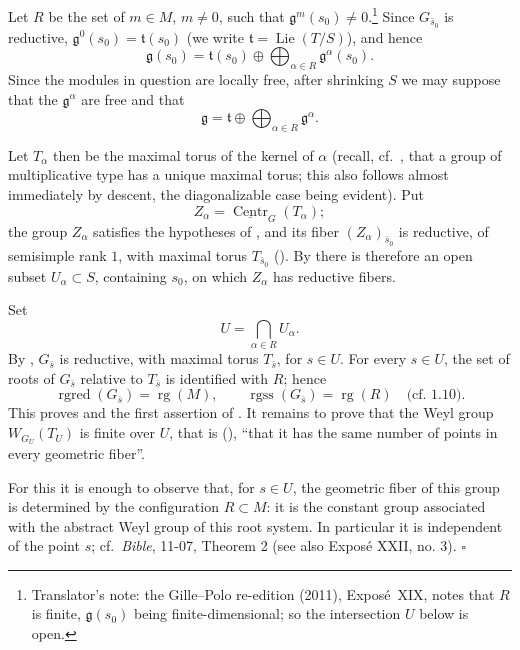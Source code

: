Let \(R\) be the set of \(m\in M\), \(m\ne0\), such that
\(\mathfrak g^{m}(s_0)\ne0\).\footnote{Translator's note: the Gille--Polo re-edition (2011), Exposé~XIX, notes that
\(R\) is finite, \(\mathfrak g(s_0)\) being finite-dimensional; so the
intersection \(U\) below is open.}  Since \(G_{\bar s_0}\) is reductive,
\(\mathfrak g^{0}(s_0)=\mathfrak t(s_0)\) (we write
\(\mathfrak t=\operatorname{Lie}(T/S)\)), and hence
\[
  \mathfrak g(s_0)
  =
  \mathfrak t(s_0)
  \oplus
  \bigoplus_{\alpha\in R}\mathfrak g^{\alpha}(s_0).
\]
Since the modules in question are locally free, after shrinking \(S\)
we may suppose that the \(\mathfrak g^{\alpha}\) are free and that
\[
  \mathfrak g
  =
  \mathfrak t
  \oplus
  \bigoplus_{\alpha\in R}\mathfrak g^{\alpha}.
\]

Let \(T_\alpha\) then be the maximal torus of the kernel of \(\alpha\)
(recall, cf.\ , that a group of multiplicative type has a
unique maximal torus; this also follows almost immediately by descent,
the diagonalizable case being evident).  Put
\[
  Z_\alpha=\underline{\operatorname{Centr}}_G(T_\alpha);
\]
the group \(Z_\alpha\) satisfies the hypotheses of , and its fiber
\((Z_\alpha)_{\bar s_0}\) is reductive, of semisimple rank \(1\), with
maximal torus \(T_{\bar s_0}\) ().  By  there is therefore an open
subset \(U_\alpha\subset S\), containing \(s_0\), on which
\(Z_\alpha\) has reductive fibers.

Set
\[
  U=\bigcap_{\alpha\in R}U_\alpha.
\]
By , \(G_{\bar s}\) is reductive, with maximal torus
\(T_{\bar s}\), for \(s\in U\).  For every \(s\in U\), the set of roots of
\(G_{\bar s}\) relative to \(T_{\bar s}\) is identified with \(R\); hence
\[
  \operatorname{rgred}(G_{\bar s})
  =
  \operatorname{rg}(M),
  \qquad
  \operatorname{rgss}(G_{\bar s})
  =
  \operatorname{rg}(R)
  \quad\text{(cf. 1.10).}
\]
This proves \textup{} and the first assertion of \textup{}.
It remains to prove that the Weyl group \(W_{G_U}(T_U)\) is finite over
\(U\), that is \textup{()}, ``that it has the same number of points in
every geometric fiber''.

For this it is enough to observe that, for \(s\in U\), the geometric
fiber of this group is determined by the configuration \(R\subset M\):
it is the constant group associated with the abstract Weyl group of
this root system.  In particular it is independent of the point \(s\); cf.\
\emph{Bible}, 11-07, Theorem 2 (see also Exposé XXII, no. 3).
\hfill\(\square\)

